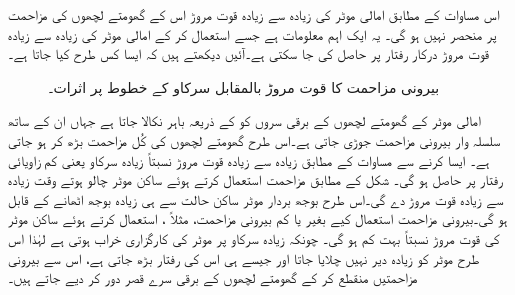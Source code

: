 اس مساوات کے مطابق امالی موٹر کی زیادہ سے زیادہ قوت مروڑ اس کے گھومتے لچھوں کی  مزاحمت پر منحصر نہیں ہو گی۔ یہ ایک اہم معلومات ہے جسے استعمال کر کے امالی موٹر کی زیادہ سے زیادہ قوت مروڑ درکار رفتار پر  حاصل کی جا سکتی ہے۔آئیں دیکھتے ہیں کہ ایسا کس طرح کیا جاتا ہے۔
\begin{figure}
\centering
%
\caption{بیرونی مزاحمت  کا قوت مروڑ بالمقابل سرکاو کے خطوط پر اثرات۔}
\label{شکل_امالی_بیرونی_مزاحمت_اور_مروٹ}
\end{figure}

امالی موٹر کے گھومتے لچھوں کے برقی سروں کو  کے ذریعہ باہر نکالا جاتا ہے جہاں ان کے ساتھ سلسلہ وار بیرونی مزاحمت جوڑی جاتی ہے۔اس طرح گھومتے لچھوں کی کُل مزاحمت بڑھ کر  ہو جاتی ہے۔ ایسا کرنے سے مساوات   کے مطابق زیادہ سے زیادہ قوت مروڑ نسبتاً زیادہ سرکاو یعنی کم زاویائی رفتار پر حاصل ہو گی۔ شکل  کے مطابق مزاحمت  استعمال کرتے ہوئے ساکن موٹر چالو ہوتے  وقت زیادہ سے زیادہ قوت مروڑ دے گی۔اس طرح بوجھ بردار موٹر ساکن حالت سے ہی زیادہ بوجھ اٹھانے کے قابل ہو گی۔بیرونی مزاحمت استعمال کیے بغیر یا کم بیرونی مزاحمت، مثلاً ، استعمال کرتے ہوئے ساکن موٹر کی قوت مروڑ نسبتاً بہت کم ہو گی۔  چونکہ زیادہ سرکاو پر موٹر کی کارگزاری خراب ہوتی ہے لہٰذا اس طرح موٹر کو زیادہ دیر نہیں چلایا جاتا اور جیسے ہی اس کی رفتار بڑھ جاتی ہے، اس سے  بیرونی مزاحمتیں منقطع کر کے گھومتے لچھوں کے برقی سرے قصر دور کر دیے جاتے ہیں۔


